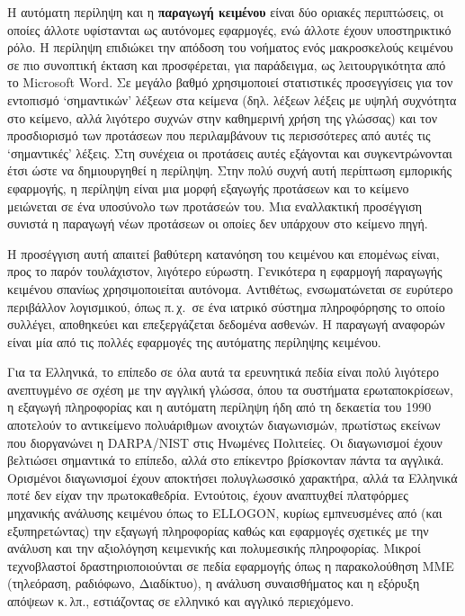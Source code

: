 \documentclass[]{../../metanetpaper}
\begin{document}
\begin{multicols}{2}
Η αυτόματη περίληψη και η \textbf{παραγωγή κειμένου} είναι δύο οριακές περιπτώσεις, οι οποίες άλλοτε υφίστανται ως αυτόνομες εφαρμογές, ενώ άλλοτε έχουν υποστηρικτικό ρόλο. Η περίληψη επιδιώκει την απόδοση του νοήματος ενός μακροσκελούς κειμένου σε πιο συνοπτική έκταση και προσφέρεται, για παράδειγμα, ως λειτουργικότητα από το Microsoft Word. Σε μεγάλο βαθμό χρησιμοποιεί στατιστικές προσεγγίσεις για τον εντοπισμό ‘σημαντικών’ λέξεων στα κείμενα (δηλ. λέξεων λέξεις με υψηλή συχνότητα στο κείμενο, αλλά λιγότερο συχνών στην καθημερινή χρήση της γλώσσας) και τον προσδιορισμό των προτάσεων που περιλαμβάνουν τις περισσότερες από αυτές τις ‘σημαντικές’ λέξεις. Στη συνέχεια οι προτάσεις αυτές εξάγονται και συγκεντρώνονται έτσι ώστε να δημιουργηθεί η περίληψη. Στην πολύ συχνή αυτή περίπτωση εμπορικής εφαρμογής, η περίληψη είναι μια μορφή εξαγωγής προτάσεων και το κείμενο μειώνεται σε ένα υποσύνολο των προτάσεών του. Μια εναλλακτική προσέγγιση συνιστά η παραγωγή νέων προτάσεων οι οποίες δεν υπάρχουν στο κείμενο πηγή.


Η προσέγγιση αυτή απαιτεί βαθύτερη κατανόηση του κειμένου και επομένως είναι, προς το παρόν τουλάχιστον, λιγότερο εύρωστη. Γενικότερα η εφαρμογή παραγωγής κειμένου σπανίως χρησιμοποιείται αυτόνομα. Αντιθέτως, ενσωματώνεται σε ευρύτερο περιβάλλον λογισμικού, όπως π.\,χ.~σε ένα ιατρικό σύστημα πληροφόρησης το οποίο συλλέγει, αποθηκεύει και επεξεργάζεται δεδομένα ασθενών. Η παραγωγή αναφορών είναι μία από τις πολλές εφαρμογές της αυτόματης περίληψης κειμένου. 

Για τα Ελληνικά, το επίπεδο σε όλα αυτά τα ερευνητικά πεδία είναι πολύ λιγότερο ανεπτυγμένο σε σχέση με την αγγλική γλώσσα, όπου τα συστήματα ερωταποκρίσεων, η εξαγωγή πληροφορίας και η αυτόματη περίληψη ήδη από τη δεκαετία του 1990 αποτελούν το αντικείμενο πολυάριθμων ανοιχτών διαγωνισμών, πρωτίστως εκείνων που διοργανώνει η DARPA/NIST στις Ηνωμένες Πολιτείες. Οι διαγωνισμοί έχουν βελτιώσει σημαντικά το επίπεδο, αλλά στο επίκεντρο βρίσκονταν πάντα τα αγγλικά. Ορισμένοι διαγωνισμοί έχουν αποκτήσει πολυγλωσσικό χαρακτήρα, αλλά τα Ελληνικά ποτέ δεν είχαν την πρωτοκαθεδρία. Εντούτοις, έχουν αναπτυχθεί πλατφόρμες μηχανικής ανάλυσης κειμένου όπως το ELLOGON, κυρίως εμπνευσμένες από (και εξυπηρετώντας) την εξαγωγή πληροφορίας καθώς και εφαρμογές σχετικές με την ανάλυση και την  αξιολόγηση κειμενικής και πολυμεσικής πληροφορίας. Μικροί τεχνοβλαστοί δραστηριοποιούνται σε πεδία εφαρμογής όπως η παρακολούθηση ΜΜΕ (τηλεόραση, ραδιόφωνο, Διαδίκτυο), η ανάλυση συναισθήματος και η εξόρυξη απόψεων κ.\,λπ., εστιάζοντας σε ελληνικό και αγγλικό περιεχόμενο. 


\end{multicols}
\end{document}
